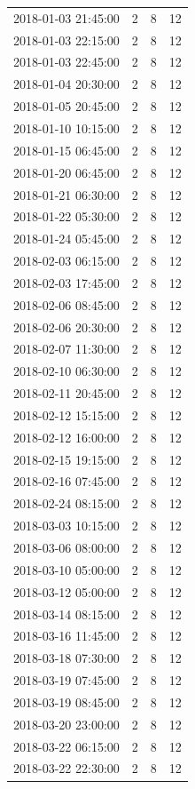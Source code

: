 \begin{tabular}{lrrr}
2018-01-03 21:45:00 & 2 & 8 & 12 \\
2018-01-03 22:15:00 & 2 & 8 & 12 \\
2018-01-03 22:45:00 & 2 & 8 & 12 \\
2018-01-04 20:30:00 & 2 & 8 & 12 \\
2018-01-05 20:45:00 & 2 & 8 & 12 \\
2018-01-10 10:15:00 & 2 & 8 & 12 \\
2018-01-15 06:45:00 & 2 & 8 & 12 \\
2018-01-20 06:45:00 & 2 & 8 & 12 \\
2018-01-21 06:30:00 & 2 & 8 & 12 \\
2018-01-22 05:30:00 & 2 & 8 & 12 \\
2018-01-24 05:45:00 & 2 & 8 & 12 \\
2018-02-03 06:15:00 & 2 & 8 & 12 \\
2018-02-03 17:45:00 & 2 & 8 & 12 \\
2018-02-06 08:45:00 & 2 & 8 & 12 \\
2018-02-06 20:30:00 & 2 & 8 & 12 \\
2018-02-07 11:30:00 & 2 & 8 & 12 \\
2018-02-10 06:30:00 & 2 & 8 & 12 \\
2018-02-11 20:45:00 & 2 & 8 & 12 \\
2018-02-12 15:15:00 & 2 & 8 & 12 \\
2018-02-12 16:00:00 & 2 & 8 & 12 \\
2018-02-15 19:15:00 & 2 & 8 & 12 \\
2018-02-16 07:45:00 & 2 & 8 & 12 \\
2018-02-24 08:15:00 & 2 & 8 & 12 \\
2018-03-03 10:15:00 & 2 & 8 & 12 \\
2018-03-06 08:00:00 & 2 & 8 & 12 \\
2018-03-10 05:00:00 & 2 & 8 & 12 \\
2018-03-12 05:00:00 & 2 & 8 & 12 \\
2018-03-14 08:15:00 & 2 & 8 & 12 \\
2018-03-16 11:45:00 & 2 & 8 & 12 \\
2018-03-18 07:30:00 & 2 & 8 & 12 \\
2018-03-19 07:45:00 & 2 & 8 & 12 \\
2018-03-19 08:45:00 & 2 & 8 & 12 \\
2018-03-20 23:00:00 & 2 & 8 & 12 \\
2018-03-22 06:15:00 & 2 & 8 & 12 \\
2018-03-22 22:30:00 & 2 & 8 & 12 \\

\end{tabular}
